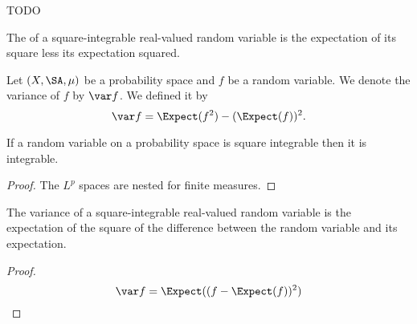 
\sbasic



\sstart



TODO


The 
of a square-integrable
real-valued random variable
is the expectation of its
square less its expectation
squared.


Let $(X, \SA, \mu)$
be a probability space
and $f$ be a random variable.
We denote the variance
of $f$ by $\var f$.
We defined it by
\[
  \var f = \Expect(f^2) - (\Expect(f))^2.
\]


\begin{prop}
  If a random
  variable on a probability
  space is square integrable
  then it is integrable.
  \begin{proof}
    The $L^p$ spaces are nested
    for finite measures.
  \end{proof}
\end{prop}

\begin{prop}
The variance of a
square-integrable
real-valued random
variable is
the expectation
of the square of
the difference between
the random variable
and its expectation.
\begin{proof}
\[
  \var f = \Expect((f - \Expect(f))^2)
\]
\end{proof}
\end{prop}


\strats

